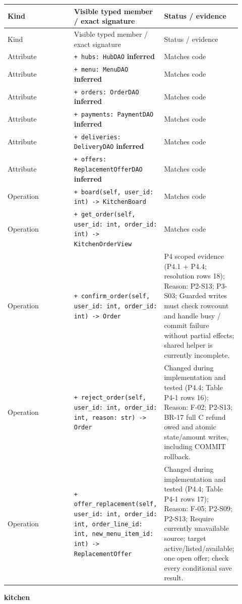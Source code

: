 \begin{longtable}{>{\raggedright\arraybackslash}p{0.3067\linewidth}>{\raggedright\arraybackslash}p{0.3067\linewidth}>{\raggedright\arraybackslash}p{0.3067\linewidth}}
Kind & Visible typed member / exact signature & Status / evidence \\
\hline\endfirsthead
Kind & Visible typed member / exact signature & Status / evidence \\
\hline\endhead
Attribute & \texttt{+ hubs: HubDAO} \textbf{inferred} & Matches code \\
Attribute & \texttt{+ menu: MenuDAO} \textbf{inferred} & Matches code \\
Attribute & \texttt{+ orders: OrderDAO} \textbf{inferred} & Matches code \\
Attribute & \texttt{+ payments: PaymentDAO} \textbf{inferred} & Matches code \\
Attribute & \texttt{+ deliveries: DeliveryDAO} \textbf{inferred} & Matches code \\
Attribute & \texttt{+ offers: ReplacementOfferDAO} \textbf{inferred} & Matches code \\
Operation & \texttt{+ board(self, user\_\allowbreak{}id: int) -\textgreater{} KitchenBoard} & Matches code \\
Operation & \texttt{+ get\_\allowbreak{}order(self, user\_\allowbreak{}id: int, order\_\allowbreak{}id: int) -\textgreater{} KitchenOrderView} & Matches code \\
Operation & \texttt{+ confirm\_\allowbreak{}order(self, user\_\allowbreak{}id: int, order\_\allowbreak{}id: int) -\textgreater{} Order} & P4 scoped evidence (P4.1 + P4.4; resolution rows 18); Reason: P2-S13; P3-S03; Guarded writes must check rowcount and handle busy / commit failure without partial effects; shared helper is currently incomplete. \\
Operation & \texttt{+ reject\_\allowbreak{}order(self, user\_\allowbreak{}id: int, order\_\allowbreak{}id: int, reason: str) -\textgreater{} Order} & Changed during implementation and tested (P4.4; Table P4-1 rows 16); Reason: F-02; P2-S13; BR-17 full C refund owed and atomic state/amount writes, including COMMIT rollback. \\
Operation & \texttt{+ offer\_\allowbreak{}replacement(self, user\_\allowbreak{}id: int, order\_\allowbreak{}id: int, order\_\allowbreak{}line\_\allowbreak{}id: int, new\_\allowbreak{}menu\_\allowbreak{}item\_\allowbreak{}id: int) -\textgreater{} ReplacementOffer} & Changed during implementation and tested (P4.4; Table P4-1 rows 17); Reason: F-05; P2-S09; P2-S13; Require currently unavailable source; target active/listed/available; one open offer; check every conditional save result. \\
\end{longtable}
\textbf{kitchen}

